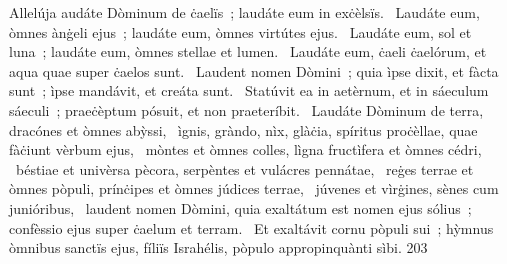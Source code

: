 { Allelúja}
{%
audáte Dòminum de ċaelïs~; laudáte eum in exċèlsïs. 
~Laudáte eum, òmnes ànġeli ejus~; laudáte eum, òmnes virtútes ejus. 
~Laudáte eum, sol et luna~; laudáte eum, òmnes stellae et lumen. 
~Laudáte eum, ċaeli ċaelórum, et aqua quae super ċaelos sunt. 
~Laudent nomen Dòmini~; quia ìpse dixit, et fàcta sunt~; ìpse mandávit, et creáta sunt. 
~Statúvit ea in aetèrnum, et in sáeculum sáeculi~; praeċèptum pósuit, et non praeteríbit. 
~Laudáte Dòminum de terra, dracónes et òmnes abỳssi, 
~ìgnis, gràndo, nìx, glàċia, spíritus proċèllae, quae fàċiunt vèrbum ejus, 
~mòntes et òmnes colles, lìgna fructìfera et òmnes cédri, 
~béstiae et univèrsa pècora, serpèntes et vulácres pennátae, 
~reġes terrae et òmnes pòpuli, prínċipes et òmnes júdices terrae, 
~júvenes et vìrġines, sènes cum junióribus, 
~laudent nomen Dòmini, quia exaltátum est nomen ejus sólius~; confèssio ejus super ċaelum et terram. 
~Et exaltávit cornu pòpuli sui~; hỳmnus òmnibus sanctïs ejus, fíliïs Israhélis, pòpulo appropinquànti sìbi. 
}
{20}{3}
